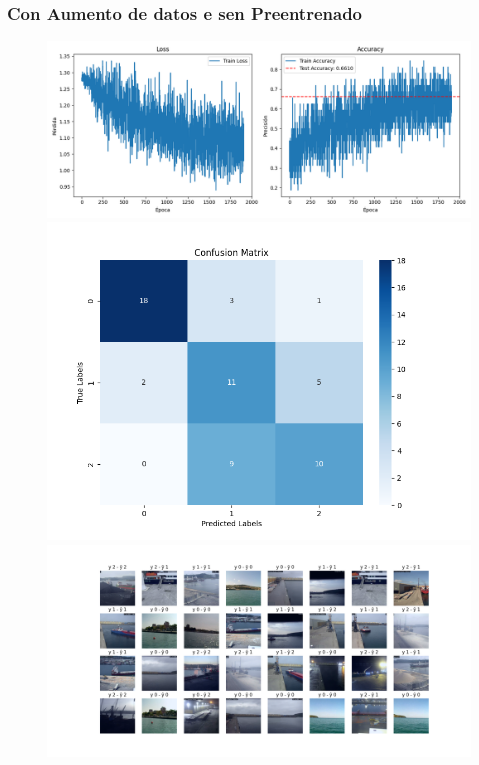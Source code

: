 \documentclass{article}
\begin{document}
\subsubsection{Con Aumento de datos e sen Preentrenado}
\begin{figure}[H]
    \centering
    \begin{minipage}{0.55\textwidth}
        \centering
        \includegraphics[width=\linewidth]{../figures/LOSS__A_True_P_False_D_True_MLP_True_efficientnet_b4.png}
    \end{minipage}
    \begin{minipage}{0.3\textwidth}
        \centering
        \includegraphics[width=\linewidth]{../figures/CM__A_True_P_False_D_True_MLP_True_efficientnet_b4.png}
    \end{minipage}
    \begin{minipage}{0.7\textwidth}
        \centering
        \includegraphics[width=\linewidth]{../figures/GRID__A_True_P_False_D_True_MLP_True_efficientnet_b4.png}
    \end{minipage}
\end{figure}
\end{document}
